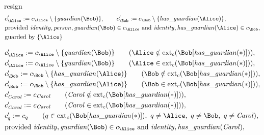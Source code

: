 resign
\fi
\begin{align*}
&
c'_
{
\Alice
}
 := 
c_
{
\Alice
}
 \setminus 
\{
\mathit{\detokenize{
guardian
}}
(
\Bob
)
\}
, \qquad 
c'_
{
\Bob
}
 := 
c_
{
\Bob
}
 \setminus 
\{
\mathit{\detokenize{
has_guardian
}}
(
\Alice
)
\}
,\\
&
\text{provided } 
\mathit{\detokenize{
identity
}}
,
\mathit{\detokenize{
person
}}
,
\mathit{\detokenize{
guardian
}}
(
\Bob
)
 \in c_
{
\Alice
}
 \text{ and } 
\mathit{\detokenize{
identity
}}
,
\mathit{\detokenize{
has_guardian
}}
(
\Alice
)
 \in c_
{
\Bob
}
,\\
&
\text{guarded by } \{
\Alice
\}
\end{align*}

\begin{align*}
&
c'_
{
\Alice
}
 := 
c_
{
\Alice
}
 \setminus 
\{
\mathit{\detokenize{
guardian
}}
(
\Bob
)
\}
 \qquad (
\Alice
 \notin 
\mathrm{ext}_c(
\Bob
[
\mathit{\detokenize{
has_guardian
}}
(
\ast
)
]
)
)
,\\
&
c'_
{
\Alice
}
 := 
c_
{
\Alice
}
 \setminus 
\{
\mathit{\detokenize{
guardian
}}
(
\Bob
)
\}
 \qquad (
\Alice
 \in 
\mathrm{ext}_c(
\Bob
[
\mathit{\detokenize{
has_guardian
}}
(
\ast
)
]
)
)
,\\
&
c'_
{
\Bob
}
 := 
c_
{
\Bob
}
 \setminus 
\{
\mathit{\detokenize{
has_guardian
}}
(
\Alice
)
\}
 \qquad (
\Bob
 \notin 
\mathrm{ext}_c(
\Bob
[
\mathit{\detokenize{
has_guardian
}}
(
\ast
)
]
)
)
,\\
&
c'_
{
\Bob
}
 := 
c_
{
\Bob
}
 \setminus 
\{
\mathit{\detokenize{
has_guardian
}}
(
\Alice
)
\}
 \qquad (
\Bob
 \in 
\mathrm{ext}_c(
\Bob
[
\mathit{\detokenize{
has_guardian
}}
(
\ast
)
]
)
)
,\\
&
c'_
{
\mathit{Carol}
}
 := 
c_
{
\mathit{Carol}
}
 \qquad (
\mathit{Carol}
 \notin 
\mathrm{ext}_c(
\Bob
[
\mathit{\detokenize{
has_guardian
}}
(
\ast
)
]
)
)
,\\
&
c'_
{
\mathit{Carol}
}
 := 
c_
{
\mathit{Carol}
}
 \qquad (
\mathit{Carol}
 \in 
\mathrm{ext}_c(
\Bob
[
\mathit{\detokenize{
has_guardian
}}
(
\ast
)
]
)
)
,\\
&
c'_
q
 := 
c_
q
 \qquad (
q
 \in 
\mathrm{ext}_c(
\Bob
[
\mathit{\detokenize{
has_guardian
}}
(
\ast
)
]
)
,\ 
q \neq 
\Alice
,\ 
q \neq 
\Bob
,\ 
q \neq 
\mathit{Carol}
)
,\\
&
\text{provided } 
\mathit{\detokenize{
identity
}}
,
\mathit{\detokenize{
guardian
}}
(
\Bob
)
 \in c_
{
\Alice
}
 \text{ and } 
\mathit{\detokenize{
identity
}}
,
\mathit{\detokenize{
has_guardian
}}
(
\mathit{Carol}
)
,
\mathit{\detokenize{
}}
\end{align*}
